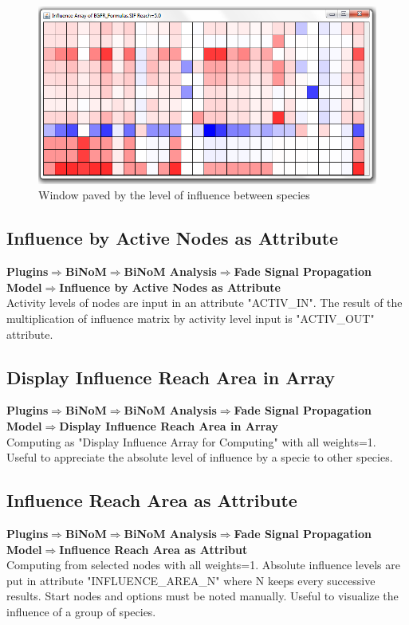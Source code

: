 \begin{figure}
\centering
\includegraphics[width=1.0\textwidth]{graphics/paved_window}
\caption{Window paved by the level of influence between species}
\label{paved_window}
\end{figure}

\subsection{Influence by Active Nodes as Attribute}
\textbf{Plugins$\Rightarrow$BiNoM$\Rightarrow$BiNoM Analysis$\Rightarrow$Fade Signal Propagation Model$\Rightarrow$Influence by Active Nodes as Attribute}\\
Activity levels of nodes are input in an attribute "ACTIV\_IN". The result of the multiplication of influence matrix by activity level input is "ACTIV\_OUT" attribute.

\subsection{Display Influence Reach Area in Array}
\textbf{Plugins$\Rightarrow$BiNoM$\Rightarrow$BiNoM Analysis$\Rightarrow$Fade Signal Propagation Model$\Rightarrow$Display Influence Reach Area in Array}\\
Computing as "Display Influence Array for Computing" with all weights=1. Useful to appreciate the absolute level of influence by a specie to other species.

\subsection{Influence Reach Area as Attribute}
\textbf{Plugins$\Rightarrow$BiNoM$\Rightarrow$BiNoM Analysis$\Rightarrow$Fade Signal Propagation Model$\Rightarrow$Influence Reach Area as Attribut}\\
Computing from selected nodes with all weights=1. Absolute influence levels are put in attribute "INFLUENCE\_AREA\_N" where N keeps every successive results. Start nodes and options must be noted manually. Useful to visualize the influence of a group of species.

